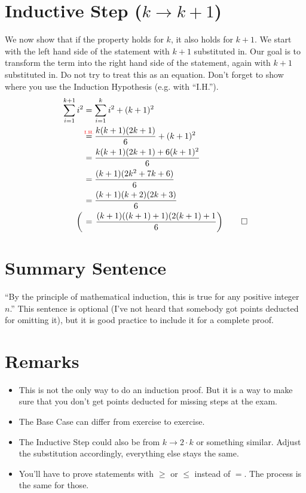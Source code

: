 \documentclass[a4paper,10pt]{article}
\begin{document}
  \section{Inductive Step (\texorpdfstring{\(k \to k+1\)}{})}
  We now show that if the property holds for \(k\), it also holds for \(k+1\).
  We start with the left hand side of the statement with \(k+1\) substituted in. Our goal is to transform the term into the right hand side of the statement, again with \(k+1\) substituted in. Do not try to treat this as an equation. Don't forget to show where you use the Induction Hypothesis (e.g. with ``I.H.'').
  \begin{align*}
    \sum_{i=1}^{k+1}i^2 &= \sum_{i=1}^{k} i^2 + (k+1)^2 \\
    &\stackrel{\mathclap{\text{\tiny\color{red} I.H.}}}{=} \frac{k(k+1)(2k+1)}{6} + (k+1)^2 \\
    &=\frac{k(k+1)(2k+1) + 6(k+1)^2}{6} \\
    &=\frac{(k+1)(2k^2 + 7k + 6)}{6} \\
    &=\frac{(k+1)(k+2)(2k+3)}{6} \\
    \left(\vphantom{\frac{1}{1}}\right. &= \left. \frac{(k+1)((k+1) + 1)(2(k+1) + 1}{6} \right) \qed\\
  \end{align*}
  \section{Summary Sentence}
  ``By the principle of mathematical induction, this is true for any positive integer \(n\).'' This sentence is optional (I've not heard that somebody got points deducted for omitting it), but it is good practice to include it for a complete proof.
  \section*{Remarks}
  \begin{itemize}
      \item This is not the only way to do an induction proof. But it is a way to make sure that you don't get points deducted for missing steps at the exam.
      \item The Base Case can differ from exercise to exercise.
      \item The Inductive Step could also be from \(k \to 2 \cdot k\) or something similar. Adjust the substitution accordingly, everything else stays the same.
      \item You'll have to prove statements with \(\ge\) or \(\le\) instead of \(=\). The process is the same for those.
  \end{itemize}

  \bigskip
\end{document}
